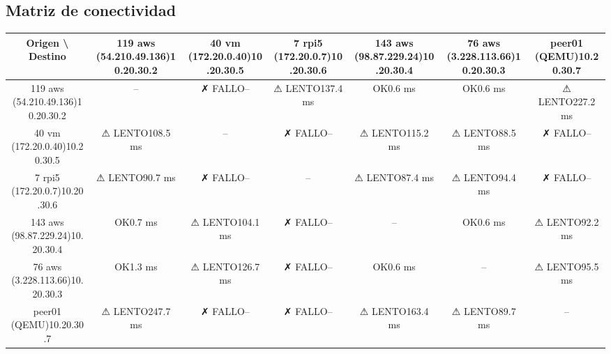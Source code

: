 \documentclass[11pt,a4paper]{article}
\begin{document}
\subsection{Matriz de conectividad}
\begin{longtable}{|c|c|c|c|c|c|c|}
\hline
Origen \textbackslash{} Destino & 119 aws (54.210.49.136)10.20.30.2 & 40 vm (172.20.0.40)10.20.30.5 & 7 rpi5 (172.20.0.7)10.20.30.6 & 143 aws (98.87.229.24)10.20.30.4 & 76 aws (3.228.113.66)10.20.30.3 & peer01 (QEMU)10.20.30.7 \\ \hline
119 aws (54.210.49.136)10.20.30.2 & -- & ✗ FALLO-- & ⚠ LENTO137.4 ms & OK0.6 ms & OK0.6 ms & ⚠ LENTO227.2 ms \\ \hline
40 vm (172.20.0.40)10.20.30.5 & ⚠ LENTO108.5 ms & -- & ✗ FALLO-- & ⚠ LENTO115.2 ms & ⚠ LENTO88.5 ms & ✗ FALLO-- \\ \hline
7 rpi5 (172.20.0.7)10.20.30.6 & ⚠ LENTO90.7 ms & ✗ FALLO-- & -- & ⚠ LENTO87.4 ms & ⚠ LENTO94.4 ms & ✗ FALLO-- \\ \hline
143 aws (98.87.229.24)10.20.30.4 & OK0.7 ms & ⚠ LENTO104.1 ms & ✗ FALLO-- & -- & OK0.6 ms & ⚠ LENTO92.2 ms \\ \hline
76 aws (3.228.113.66)10.20.30.3 & OK1.3 ms & ⚠ LENTO126.7 ms & ✗ FALLO-- & OK0.6 ms & -- & ⚠ LENTO95.5 ms \\ \hline
peer01 (QEMU)10.20.30.7 & ⚠ LENTO247.7 ms & ✗ FALLO-- & ✗ FALLO-- & ⚠ LENTO163.4 ms & ⚠ LENTO89.7 ms & -- \\ \hline
\end{longtable}
\end{document}
